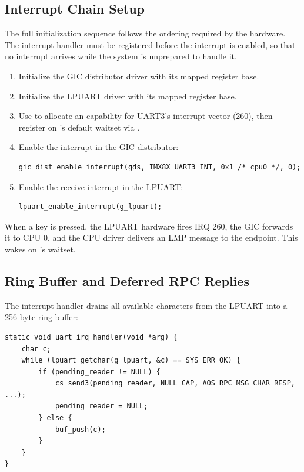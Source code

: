 \subsection{Interrupt Chain Setup}

The full initialization sequence follows the ordering required by the hardware. The interrupt
handler must be registered before the interrupt is enabled, so that no interrupt arrives
while the system is unprepared to handle it.

\begin{enumerate}
  \item Initialize the GIC distributor driver with its mapped register base.
  \item Initialize the LPUART driver with its mapped register base.
  \item Use  to allocate an 
        capability for UART3's interrupt vector (260), then register
         on 's default waitset via
        .
  \item Enable the interrupt in the GIC distributor:
\begin{lstlisting}
gic_dist_enable_interrupt(gds, IMX8X_UART3_INT, 0x1 /* cpu0 */, 0);
\end{lstlisting}
  \item Enable the receive interrupt in the LPUART:
\begin{lstlisting}
lpuart_enable_interrupt(g_lpuart);
\end{lstlisting}
\end{enumerate}

\medskip\noindent
When a key is pressed, the LPUART hardware fires IRQ 260, the GIC forwards it to
CPU 0, and the CPU driver delivers an LMP message to the  endpoint.
This wakes  on 's waitset.

\subsection{Ring Buffer and Deferred RPC Replies}

The interrupt handler drains all available characters from the LPUART into a 256-byte
ring buffer:

\begin{lstlisting}
static void uart_irq_handler(void *arg) {
    char c;
    while (lpuart_getchar(g_lpuart, &c) == SYS_ERR_OK) {
        if (pending_reader != NULL) {
            cs_send3(pending_reader, NULL_CAP, AOS_RPC_MSG_CHAR_RESP, ...);
            pending_reader = NULL;
        } else {
            buf_push(c);
        }
    }
}
\end{lstlisting}

